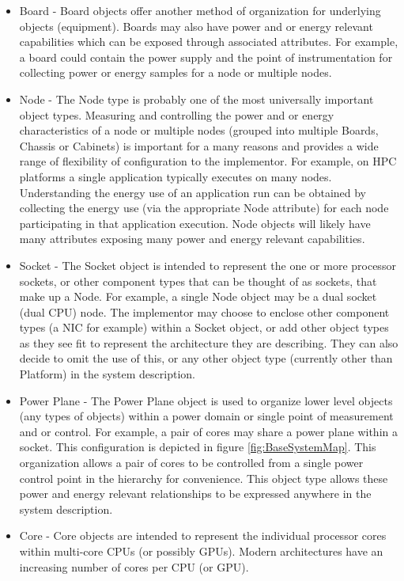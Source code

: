 \begin{itemize}[noitemsep,nolistsep]
{}
	\item{
Board - Board objects offer another method of organization for underlying objects (equipment). 
Boards may also have power and or energy relevant capabilities which can be exposed through associated attributes. 
For example, a board could contain the power supply and the point of instrumentation for collecting power or energy samples for a node or multiple nodes.
}
	\item{
Node - The Node type is probably one of the most universally important object types. 
Measuring and controlling the power and or energy characteristics of a node or multiple nodes (grouped into multiple Boards, Chassis or Cabinets) is important for a many reasons and provides a wide range of flexibility of configuration to the implementor. 
For example, on HPC platforms a single application typically executes on many nodes. 
Understanding the energy use of an application run can be obtained by collecting the energy use (via the appropriate Node attribute) for each node participating in that application execution. 
Node objects will likely have many attributes exposing many power and energy relevant capabilities.
}
	\item{
Socket - The Socket object is intended to represent the one or more processor sockets, or other component types that can be thought of as sockets, that make up a Node. 
For example, a single Node object may be a dual socket (dual CPU) node.
The implementor may choose to enclose other component types (a NIC for example) within a Socket object, or add other object types as they see fit to represent the architecture they are describing.
They can also decide to omit the use of this, or any other object type (currently other than Platform) in the system description.
}
	\item{
Power Plane - The Power Plane object is used to organize lower level objects (any types of objects) within a power domain or single point of measurement and or control.
For example, a pair of cores may share a power plane within a socket. 
This configuration is depicted in figure \ref{fig:BaseSystemMap}. 
This organization allows a pair of cores to be controlled from a single power control point in the hierarchy for convenience. 
This object type allows these power and energy relevant relationships to be expressed anywhere in the system description.
}
	\item{
Core - Core objects are intended to represent the individual processor cores within multi-core CPUs (or possibly GPUs). 
Modern architectures have an increasing number of cores per CPU (or GPU). 
}
\end{itemize}

